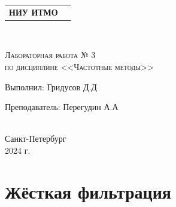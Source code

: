 


\begin{titlepage}
  \newpage
  \begin{center}
  \begin{tabular}{cc}
       \parbox{12cm}{\centering \textbf{НИУ ИТМО}}\\
       \\
       \hline
       \hline
  \end{tabular}
  \end{center}

  \begin{center}
  \\ 
  \end{center}
  
  \vspace{1cm}
  
  \begin{center}
      \textsc{Лабораторная работа № 3\\ по дисциплине <<Частотные методы>>}
  \end{center}
  
  \vspace{8em}
  
  \noindent Выполнил:  \hfill Гридусов Д.Д
  
  \vspace{20pt}
  \noindent Преподаватель: \hfill Перегудин А.А \\
  \\
  \vfill
  \begin{center}
  Санкт-Петербург \\2024 г.
  \end{center}
  
  \end{titlepage}
  
  \tableofcontents
  \newpage
  \section{Жёсткая фильтрация}
